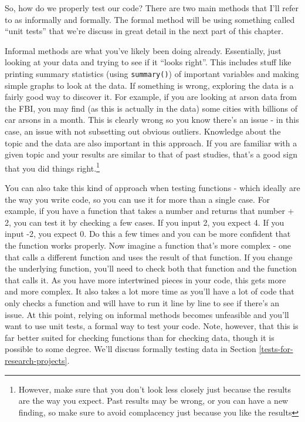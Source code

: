 \documentclass[
  12pt,
]{book}
\begin{document}
So, how do we properly test our code? There are two main methods that I'll refer to as informally and formally. The formal method will be using something called ``unit tests'' that we're discuss in great detail in the next part of this chapter.

Informal methods are what you've likely been doing already. Essentially, just looking at your data and trying to see if it ``looks right''. This includes stuff like printing summary statistics (using \texttt{summary()}) of important variables and making simple graphs to look at the data. If something is wrong, exploring the data is a fairly good way to discover it. For example, if you are looking at arson data from the FBI, you may find (as this is actually in the data) some cities with billions of car arsons in a month. This is clearly wrong so you know there's an issue - in this case, an issue with not subsetting out obvious outliers. Knowledge about the topic and the data are also important in this approach. If you are familiar with a given topic and your results are similar to that of past studies, that's a good sign that you did things right.\footnote{However, make sure that you don't look less closely just because the results are the way you expect. Past results may be wrong, or you can have a new finding, so make sure to avoid complacency just because you like the results}

You can also take this kind of approach when testing functions - which ideally are the way you write code, so you can use it for more than a single case. For example, if you have a function that takes a number and returns that number + 2, you can test it by checking a few cases. If you input 2, you expect 4. If you input -2, you expect 0. Do this a few times and you can be more confident that the function works properly. Now imagine a function that's more complex - one that calls a different function and uses the result of that function. If you change the underlying function, you'll need to check both that function and the function that calls it. As you have more intertwined pieces in your code, this gets more and more complex. It also takes a lot more time as you'll have a lot of code that only checks a function and will have to run it line by line to see if there's an issue. At this point, relying on informal methods becomes unfeasible and you'll want to use unit tests, a formal way to test your code. Note, however, that this is far better suited for checking functions than for checking data, though it is possible to some degree. We'll discuss formally testing data in Section \ref{tests-for-research-projects}.
\end{document}
